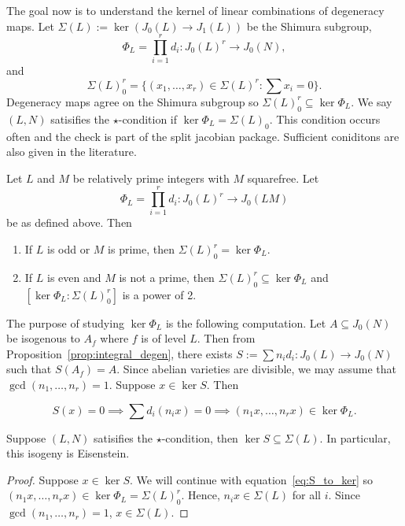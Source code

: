 \documentclass{article}
\begin{document}
The goal now is to understand the kernel of linear combinations of degeneracy
maps. Let $\Sigma(L):=\ker (J_0(L)\to J_1(L))$ be the Shimura subgroup,
\[
    \Phi_L = \prod_{i=1} ^r d_i : J_0(L)^r \to J_0(N),
\]
and
\[
    \Sigma(L)_0 ^r =\{(x_1,\ldots,x_r)\in \Sigma(L)^r: \sum x_i = 0\}.
\]
Degeneracy maps agree on the Shimura subgroup so $\Sigma(L)_0 ^r \subseteq
\ker\Phi_L$. We say $(L, N)$ satisifies the $\star$-condition if
$\ker\Phi_L=\Sigma(L)_0$. This condition occurs often and the check is part of
the split jacobian package. Sufficient coniditons are also given in the
literature.  
\begin{theorem}
    \label{ribet_ling}
    Let $L$ and $M$ be relatively prime integers with $M$ squarefree. Let
    \[
        \Phi_L = \prod_{i=1} ^r d_i  : J_0(L)^r \to J_0(LM)
    \]
    be as defined above. Then
    \begin{enumerate}
        \item 
            If $L$ is odd or $M$ is prime, then $\Sigma(L)_0 ^r=\ker\Phi_L$.
        \item
            If $L$ is even and $M$ is not a prime, then $\Sigma(L)_0 ^r
            \subseteq \ker\Phi_L$ and $[\ker\Phi_L: \Sigma(L)_0 ^r]$ is
            a power of 2.
    \end{enumerate}
\end{theorem}

The purpose of studying $\ker\Phi_L$ is the following computation. Let
$A\subseteq J_0(N)$ be isogenous to $A_f$ where $f$ is of level $L$. Then from
Proposition~\ref{prop:integral_degen}, there exists $S:=\sum n_i d_i:J_0(L)\to
J_0(N)$ such that $S(A_f)=A$. Since abelian varieties are divisible, we may
assume that $\gcd(n_1, \ldots,n_r)=1$. Suppose $x\in \ker S$. Then 

\begin{equation}
    \label{eq:S_to_ker}
    S(x) = 0 \implies \sum d_i(n_i x) =0 \implies (n_1 x,\ldots,n_r x) \in
    \ker\Phi_L. 
\end{equation}

\begin{corollary}
    \label{cor:star}
    Suppose $(L, N)$ satisifies the $\star$-condition, then $\ker S\subseteq
    \Sigma(L)$. In particular, this isogeny is Eisenstein.
\end{corollary}
\begin{proof}
    Suppose $x\in \ker S$. We will continue with equation~\eqref{eq:S_to_ker}
    so $(n_1 x, \ldots, n_r x)\in \ker\Phi_L = \Sigma(L)_0 ^r$. Hence, $n_i x\in
    \Sigma(L)$ for all $i$. Since $\gcd(n_1,\ldots,n_r)=1$, $x\in \Sigma(L)$.
\end{proof}
\end{document}
